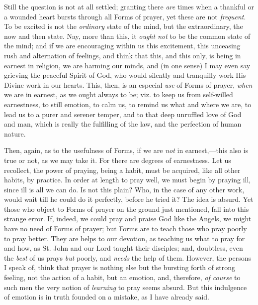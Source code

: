 Still the question is not at all settled; granting
there \emph{are} times when a thankful or a wounded heart
bursts through all Forms of prayer, yet these are not \emph{frequent}.
To be excited is not the \emph{ordinary} state of the
mind, but the extraordinary, the now and then state. Nay,
more than this, it \emph{ought not} to be the common
state of the mind; and if we are encouraging within us
this excitement, this unceasing rush and alternation of
feelings, and think that this, and this only, is being in
earnest in religion, we are harming our minds, and (in
one sense) I may even say grieving the peaceful Spirit of
God, who would silently and tranquilly work His Divine
work in our hearts. This, then, is an especial \emph{use}
of Forms of prayer, \emph{when} we are in earnest, as we
ought always to be; viz. to keep us from self-willed
earnestness, to still emotion, to calm us, to remind us
what and where we are, to lead us to a purer and serener
temper, and to that deep unruffled love of God and man,
which is really the fulfilling of the law, and the
perfection of human nature.

Then, again, as to the usefulness of Forms, if we are \emph{not}
in earnest,—this also is true or not, as we may take
it. For there are degrees of earnestness. Let us
recollect, the power of praying, being a habit, must be
acquired, like all other habits, by practice. In order at
length to pray well, we must begin by praying ill, since
ill is all we can do. Is not this plain? Who, in the case
of any other work, would wait till he could do it
perfectly, before he tried it? The idea is absurd. Yet
those who object to Forms of prayer on the ground just
mentioned, fall into this strange error. If, indeed, we
could pray and praise God like the Angels, we might have
no need of Forms of prayer; but Forms are to teach those
who pray poorly to pray better. They are helps to our
devotion, as teaching us what to pray for and how, as St.
John and our Lord taught their disciples; and, doubtless,
even the \emph{best} of us prays \emph{but} poorly, and \emph{needs}
the help of them. However, the persons I speak of, think
that prayer is nothing else but the bursting forth of
strong feeling, not the action of a habit, but an
emotion, and, therefore, \emph{of course} to such men the
very notion of \emph{learning} to pray seems absurd. But
this indulgence of emotion is in truth founded on a
mistake, as I have already said.

